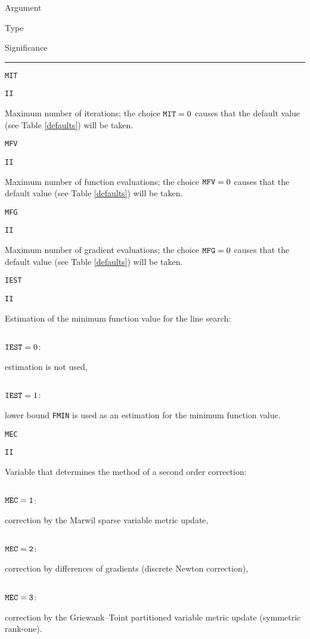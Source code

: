 \documentclass{esub2acm}
\begin{document}
\noindent\parbox{20mm}{Argument}\parbox{10mm}{$\!$Type}\parbox[t]{125mm}
  {Significance}\par\noindent\rule[1mm]{155mm}{.4pt}
  \par
\noindent\parbox{20mm}{\tt MIT}\parbox{10mm}{\tt II}\parbox[t]{125mm}{
  Maximum number of iterations; the choice ${\tt MIT}=0$ causes that the
  default value (see Table \ref{defaults}) will be taken.}
  \par\vspace{2mm}
\noindent\parbox{20mm}{\tt MFV}\parbox{10mm}{\tt II}\parbox[t]{125mm}{
  Maximum number of function evaluations; the choice ${\tt MFV}=0$ causes that the
  default value (see Table \ref{defaults}) will be taken.}
  \par\vspace{2mm}
\noindent\parbox{20mm}{\tt MFG}\parbox{10mm}{\tt II}\parbox[t]{125mm}{
  Maximum number of gradient evaluations; the choice ${\tt MFG}=0$ causes that the
  default value (see Table \ref{defaults}) will be taken.}
  \par\vspace{2mm}
\noindent\parbox{20mm}{\tt IEST}\parbox{10mm}{\tt II}\parbox[t]{125mm}{
  Estimation of the minimum function value for the line search:}  \par\vspace{1mm}
\noindent\parbox{30mm}{$\;$}\parbox{24mm}{${\tt IEST}=0$:}\parbox[t]{101mm}{
  estimation is not used,}
  \par
\noindent\parbox{30mm}{$\;$}\parbox{24mm}{${\tt IEST}=1$:}\parbox[t]{101mm}{
  lower bound {\tt FMIN} is used as an estimation for the minimum function value.}
  \par\vspace{2mm}
\noindent\parbox{20mm}{\tt MEC}\parbox{10mm}{\tt II}\parbox[t]{125mm}{
  Variable that determines the method of a second order correction:}
  \par\vspace{1mm}
\noindent\parbox{30mm}{$\;$}\parbox{24mm}{$\tt MEC=1$:}\parbox[t]{101mm}{
  correction by the Marwil sparse variable metric update,}
  \par
\noindent\parbox{30mm}{$\;$}\parbox{24mm}{$\tt MEC=2$:}\parbox[t]{101mm}{
  correction by differences of gradients (discrete Newton correction),}
  \par
\noindent\parbox{30mm}{$\;$}\parbox{24mm}{$\tt MEC=3$:}\parbox[t]{101mm}{
  correction by the Griewank--Toint partitioned variable metric update
  (symmetric rank-one).}
  \par\vspace{1mm}
\end{document}
